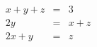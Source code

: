 \documentclass[12pt]{article}
\begin{document}
\large\parstyle\begin{eqnarray*}    x+y+z&=&3\\2y&=&x+z\\2x+y&=&z\end{eqnarray*}
\end{document}
